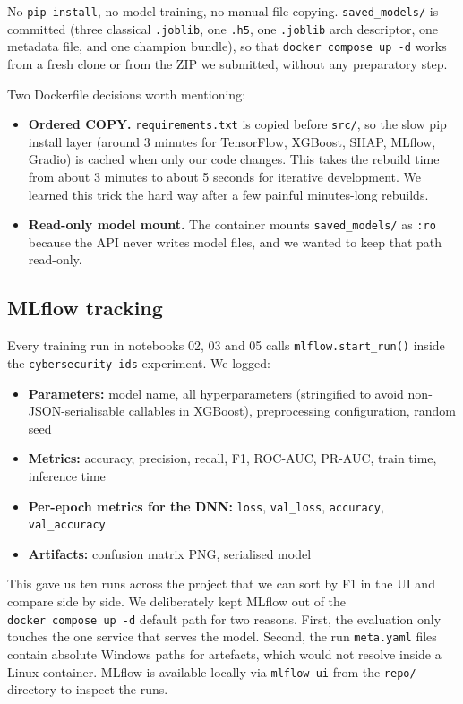 No \texttt{pip\ install}, no model training, no manual file copying.
\texttt{saved\_models/} is committed (three classical \texttt{.joblib},
one \texttt{.h5}, one \texttt{.joblib} arch descriptor, one metadata
file, and one champion bundle), so that \texttt{docker\ compose\ up\ -d}
works from a fresh clone or from the ZIP we submitted, without any
preparatory step.

Two Dockerfile decisions worth mentioning:

\begin{itemize}
\tightlist
\item
  \textbf{Ordered COPY.} \texttt{requirements.txt} is copied before
  \texttt{src/}, so the slow pip install layer (around 3 minutes for
  TensorFlow, XGBoost, SHAP, MLflow, Gradio) is cached when only our
  code changes. This takes the rebuild time from about 3 minutes to
  about 5 seconds for iterative development. We learned this trick the
  hard way after a few painful minutes-long rebuilds.
\item
  \textbf{Read-only model mount.} The container mounts
  \texttt{saved\_models/} as \texttt{:ro} because the API never writes
  model files, and we wanted to keep that path read-only.
\end{itemize}

\subsection{MLflow tracking}\label{mlflow-tracking}

Every training run in notebooks 02, 03 and 05 calls
\texttt{mlflow.start\_run()} inside the \texttt{cybersecurity-ids}
experiment. We logged:

\begin{itemize}
\tightlist
\item
  \textbf{Parameters:} model name, all hyperparameters (stringified to
  avoid non-JSON-serialisable callables in XGBoost), preprocessing
  configuration, random seed
\item
  \textbf{Metrics:} accuracy, precision, recall, F1, ROC-AUC, PR-AUC,
  train time, inference time
\item
  \textbf{Per-epoch metrics for the DNN:} \texttt{loss},
  \texttt{val\_loss}, \texttt{accuracy}, \texttt{val\_accuracy}
\item
  \textbf{Artifacts:} confusion matrix PNG, serialised model
\end{itemize}

This gave us ten runs across the project that we can sort by F1 in the
UI and compare side by side. We deliberately kept MLflow out of the
\texttt{docker\ compose\ up\ -d} default path for two reasons. First,
the evaluation only touches the one service that serves the model.
Second, the run \texttt{meta.yaml} files contain absolute Windows paths
for artefacts, which would not resolve inside a Linux container. MLflow
is available locally via \texttt{mlflow\ ui} from the \texttt{repo/}
directory to inspect the runs.

